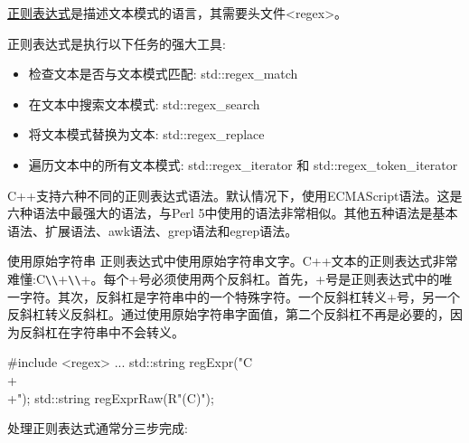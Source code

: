 
\href{http://en.cppreference.com/w/cpp/regex}{正则表达式}是描述文本模式的语言，其需要头文件<regex>。

正则表达式是执行以下任务的强大工具:

\begin{itemize}
\item 
检查文本是否与文本模式匹配: std::regex\_match

\item 
在文本中搜索文本模式: std::regex\_search

\item 
将文本模式替换为文本: std::regex\_replace

\item 
遍历文本中的所有文本模式: std::regex\_iterator 和 std::regex\_token\_iterator
\end{itemize}

C++支持六种不同的正则表达式语法。默认情况下，使用ECMAScript语法。这是六种语法中最强大的语法，与Perl 5中使用的语法非常相似。其他五种语法是基本语法、扩展语法、awk语法、grep语法和egrep语法。

\begin{myTip}{使用原始字符串}
正则表达式中使用原始字符串文字。C++文本的正则表达式非常难懂:C\verb|\\|+\verb|\\|+。每个+号必须使用两个反斜杠。首先，+号是正则表达式中的唯一字符。其次，反斜杠是字符串中的一个特殊字符。一个反斜杠转义+号，另一个反斜杠转义反斜杠。通过使用原始字符串字面值，第二个反斜杠不再是必要的，因为反斜杠在字符串中不会转义。

\begin{cpp}
#include <regex>
...
std::string regExpr("C\\+\\+");
std::string regExprRaw(R"(C\+\+)");
\end{cpp}

\end{myTip}

处理正则表达式通常分三步完成:

